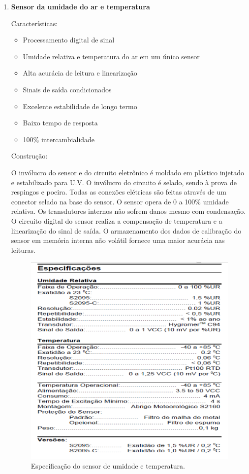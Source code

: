   \begin{enumerate}
  
    \item \textbf{Sensor da umidade do ar e temperatura}
      
	Características:
	
	\begin{itemize}
	 \item Processamento digital de sinal
	 \item Umidade relativa e temperatura do ar em um único sensor
	 \item Alta acurácia de leitura e linearização
	 \item Sinais de saída condicionados
	 \item Excelente estabilidade de longo termo
	 \item Baixo tempo de resposta
	 \item 100\% intercambialidade
	\end{itemize}

	Construção:
	
	O invólucro do sensor e do circuito eletrônico é moldado em plástico injetado e estabilizado para U.V.
	O invólucro do circuito é selado, sendo à prova de respingos e poeira. Todas as conexões elétricas
	são feitas através de um conector selado na base do sensor. O sensor opera de 0 a 100\% umidade relativa.
	Os transdutores internos não sofrem danos mesmo com condensação. O circuito digital do sensor realiza a
	compensação de temperatura e a linearização do sinal de saída. O armazenamento dos dados de calibração do
	 sensor em memória interna não volátil fornece uma maior acurácia nas leituras.
	 
	 \begin{figure}[!htbp]
	  \centering
	  \includegraphics[scale=0.5]{editaveis/figuras/especificacao_sensor_umidade}
	  \caption[Especificação do sensor de umidade e temperatura]{Especificação do sensor de umidade e temperatura. \footnotemark}
	  \FloatBarrier
	  \label{especificacao_sensor_umidade}
	 \end{figure}
	 

\end{enumerate}
